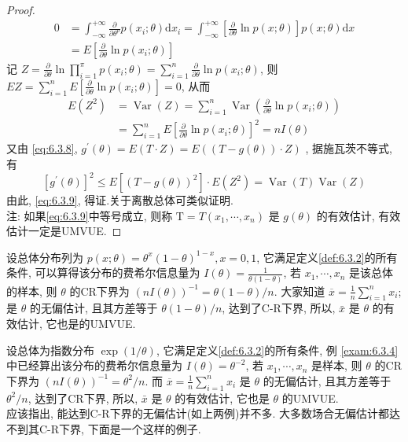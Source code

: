 \begin{proof}
\begin{align*} 0 &=\int_{-\infty}^{+\infty} \frac{\partial}{\partial \theta^{p}} p\left(x_{i} ; \theta\right) \mathrm{d} x_{i}=\int_{-\infty}^{+\infty}\left[\frac{\partial}{\partial \theta} \ln p(x ; \theta)\right] p(x ; \theta) \mathrm{d} x \\ &=E\left[\frac{\partial}{\partial \theta} \ln p\left(x_{i} ; \theta\right)\right] \end{align*}
记 $Z=\frac{\partial}{\partial \theta} \ln \prod_{i=1}^{\pi} p\left(x_{i} ; \theta\right)=\sum_{i=1}^{n} \frac{\partial}{\partial \theta} \ln p\left(x_{i} ; \theta\right)$, 则 $E Z=\sum_{i=1}^{n} E\left[\frac{\partial}{\partial \theta} \ln p\left(x_{i} ; \theta\right)\right]=0$,
从而
\begin{equation}\label{eq:6.3.10}
\begin{aligned} E\left(Z^{2}\right) &=\operatorname{Var}(Z)=\sum_{i=1}^{n} \operatorname{Var}\left(\frac{\partial}{\partial \theta} \ln p\left(x_{i} ; \theta\right)\right) \\ &=\sum_{i=1}^{n} E\left[\frac{\partial}{\partial \theta} \ln p\left(x_{i} ; \theta\right)\right]^{2}=n I(\theta) \end{aligned}
\end{equation}
又由 \ref{eq:6.3.8}, $g^{\prime}(\theta)=E(T \cdot Z)=E((T-g(\theta)) \cdot Z)$ , 据施瓦茨不等式, 有
\[\left[g^{\prime}(\theta)\right]^{2} \leqslant E\left[(T-g(\theta))^{2}\right] \cdot E\left(Z^{2}\right)=\operatorname{Var}(T) \operatorname{Var}(Z)\]
由此, \ref{eq:6.3.9}, 得证.关于离散总体可类似证明.\\
注: 如果\ref{eq:6.3.9}中等号成立, 则称 $\mathrm{T}=T\left(x_{1}, \cdots, x_{n}\right)$ 是 $g(\theta)$ 的有效估计, 有效估计一定是UMVUE.
\end{proof}

\begin{example}\label{exam:6.3.5}%
设总体分布列为 $p(x ; \theta)=\theta^{x}(1-\theta)^{1-x}, x=0,1$, 它满足定义\ref{def:6.3.2}的所有条件, 可以算得该分布的费希尔信息量为 $I(\theta)=\frac{1}{\theta(1-\theta)}$, 若 $x_{1}, \cdots, x_{n}$ 是该总体的样本, 则 $\theta$ 的CR下界为 $(n I(\theta))^{-1}=\theta(1-\theta) / n$. 大家知道 $\overline{x}=\frac{1}{n} \sum_{i=1}^{n} x_{i}$; 是 $\theta$ 的无偏估计, 且其方差等于 $\theta(1-\theta) / n$, 达到了C-R下界, 所以, $\bar x$ 是 $\theta$ 的有效估计, 它也是的UMVUE.
\end{example}

\begin{example}\label{exam:6.3.6}
设总体为指数分布 $\exp(1/\theta)$, 它满足定义\ref{def:6.3.2}的所有条件, 例
\ref{exam:6.3.4}中已经算出该分布的费希尔信息量为 $I(\theta)=\theta^{-2}$, 若 $x_{1}, \cdots, x_{n}$ 是样本, 则 $\theta$ 的CR下界为 $(n I(\theta))^{-1}=\theta^{2} / n$. 而 $\overline{x}=\frac{1}{n} \sum_{i=1}^{n} x_{i}$ 是 $\theta$ 的无偏估计, 且其方差等于 $\theta^{2} / n$, 达到了CR下界, 所以, $\bar x$ 是 $\theta$ 的有效估计, 它也是 $\theta$ 的UMVUE.\\
应该指出, 能达到C-R下界的无偏估计(如上两例)并不多. 大多数场合无偏估计都达不到其C-R下界, 下面是一个这样的例子.
\end{example}

